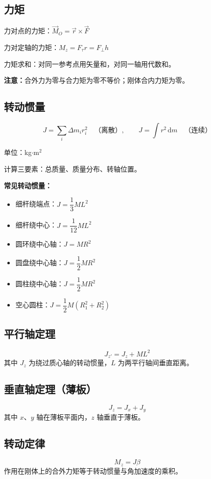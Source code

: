 \documentclass{ctexart}
\begin{document}
\subsection*{力矩}
力对点的力矩：$\vec{M}_O = \vec{r} \times \vec{F}$

力对定轴的力矩：$M_z = F_\tau r = F_\perp h$

力矩求和：对同一参考点用矢量和，对同一轴用代数和。

\textbf{注意：}合外力为零与合力矩为零不等价；刚体合内力矩为零。

\subsection*{转动惯量}
\[
J = \sum_i \Delta m_i r_i^{2}\quad\text{（离散）},\qquad
J = \int r^{2}\,\mathrm{d}m\quad\text{（连续）}
\]

单位：kg$\cdot$m$^{2}$

计算三要素：总质量、质量分布、转轴位置。

\textbf{常见转动惯量：}
\begin{itemize}
  \item 细杆绕端点：$J = \dfrac13 ML^{2}$
  \item 细杆绕中心：$J = \dfrac{1}{12} ML^{2}$
  \item 圆环绕中心轴：$J = MR^{2}$
  \item 圆盘绕中心轴：$J = \dfrac12 MR^{2}$
  \item 圆柱绕中心轴：$J = \dfrac12 MR^{2}$
  \item 空心圆柱：$J = \dfrac12 M(R_1^{2} + R_2^{2})$
\end{itemize}

\subsection*{平行轴定理}
\[
J_{z'} = J_z + ML^{2}
\]
其中 $J_z$ 为绕过质心轴的转动惯量，$L$ 为两平行轴间垂直距离。

\subsection*{垂直轴定理（薄板）}
\[
J_z = J_x + J_y
\]
其中 $x$、$y$ 轴在薄板平面内，$z$ 轴垂直于薄板。

\subsection*{转动定律}
\[
M_z = J\beta
\]
作用在刚体上的合外力矩等于转动惯量与角加速度的乘积。
\end{document}
